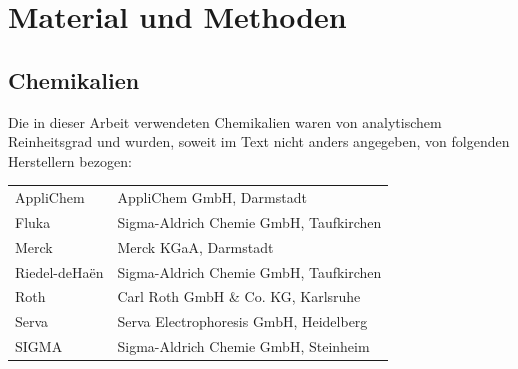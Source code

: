 \chapter{Material und Methoden}
\section{Chemikalien}
Die in dieser Arbeit verwendeten Chemikalien waren von analytischem Reinheitsgrad und wurden, soweit im Text nicht anders angegeben, von folgenden Herstellern bezogen:\\
\begin{tabular}[H]{p{}l}
AppliChem&AppliChem GmbH, Darmstadt\\
Fluka&Sigma-Aldrich Chemie GmbH, Taufkirchen\\
Merck&Merck KGaA, Darmstadt\\
Riedel-deHa\"en&Sigma-Aldrich Chemie GmbH, Taufkirchen\\
Roth&Carl Roth GmbH \& Co. KG, Karlsruhe\\
Serva&Serva Electrophoresis GmbH, Heidelberg\\
SIGMA&Sigma-Aldrich Chemie GmbH, Steinheim\\ 
\end{tabular}
